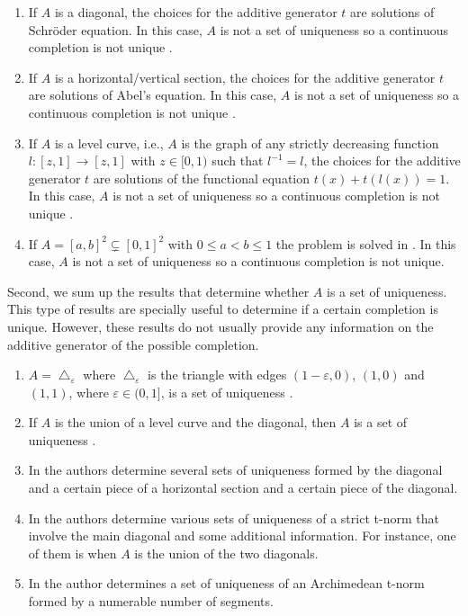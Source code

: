 \begin{enumerate}[label=(C-\arabic*)]
	\item If $A$ is a diagonal, the choices for the additive generator $t$ are solutions of Schröder equation. In this case, $A$ is not a set of uniqueness so a continuous completion is not unique \cite{Alsina2006,Kimberling1973,Mesiar1999}.
	\item If $A$ is a horizontal/vertical section, the choices for the additive generator $t$ are solutions of Abel's equation. In this case, $A$ is not a set of uniqueness so a continuous completion is not unique \cite{Alsina2006}.
	\item If $A$ is a level curve, i.e., $A$ is the graph of any strictly decreasing function $l:[z,1] \to [z,1]$ with $z \in [0,1)$ such that $l^{-1}=l$, the choices for the additive generator $t$ are solutions of the functional equation $t(x)+t(l(x))=1$. In this case, $A$ is not a set of uniqueness so a continuous completion is not unique \cite{Alsina2006}.
	\item If $A=[a,b]^2 \subsetneq [0,1]^2$ with $0 \leq a < b \leq 1$ the problem is solved in \cite{Mesiarova2017}. In this case, $A$ is not a set of uniqueness so a continuous completion is not unique.
\end{enumerate}
Second, we sum up the results that determine whether $A$ is a set of uniqueness. This type of results are specially useful to determine if a certain completion is unique. However, these results do not usually provide any information on the additive generator of the possible completion.
\begin{enumerate}[label=(SU-\arabic*)]
	\item $A=\bigtriangleup_{\varepsilon}$ where $\bigtriangleup_{\varepsilon}$ is the triangle with edges $(1-\varepsilon,0)$, $(1,0)$ and $(1,1)$, where $\varepsilon \in (0,1]$, is a set of uniqueness \cite{Kimberling1973,Klement2000}.
	\item If $A$ is the union of a level curve and the diagonal, then $A$ is a set of uniqueness \cite{Alsina2006}.
	\item In \cite{Darsow1983} the authors determine several sets of uniqueness formed by the diagonal and a certain piece of a horizontal section and a certain piece of the diagonal.
	\item In \cite{Bezivin1993} the authors determine various sets of uniqueness of a strict t-norm that involve the main diagonal and some additional information. For instance, one of them is when $A$ is the union of the two diagonals.
	\item In \cite{Jenei2005} the author determines a set of uniqueness of an Archimedean t-norm formed by a numerable number of segments.
\end{enumerate}
